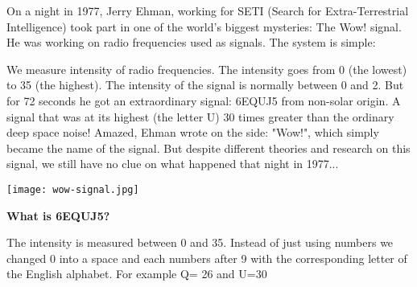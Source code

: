 \begin{tcolorbox}[colback=red!5,colframe=DarkRed!40!black,title=\textbf{The wow! signal: Our first Extra-Terrestrial communication?}]

On a night in 1977, Jerry Ehman, working for SETI (Search for Extra-Terrestrial Intelligence) took part in one of the world's biggest mysteries: The Wow! signal. 
He was working on radio frequencies used as signals. The system is simple:

We measure intensity of radio frequencies. The intensity goes from 0 (the lowest) to 35 (the highest).  The intensity of the signal is normally between 0 and 2. But for 72 seconds he got an extraordinary signal: 6EQUJ5 from non-solar origin. A signal that was at its highest (the letter U) 30 times greater than the ordinary deep space noise! Amazed, Ehman wrote on the side: "Wow!", which simply became the name of the signal. But despite different theories and research on this signal, we still have no clue on what happened that night in 1977...\\

{\centering
	\texttt{[image: wow-signal.jpg]}
\par}

\textbf{What is 6EQUJ5?}

The intensity is measured between 0 and 35. Instead of just using numbers we changed 0 into a space and each numbers after 9 with the corresponding letter of the English alphabet. For example Q= 26 and U=30
\end{tcolorbox}